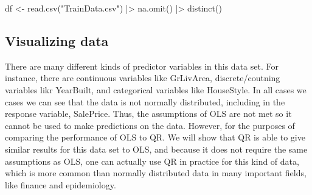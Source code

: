 \documentclass[
  letterpaper,
  DIV=11,
  numbers=noendperiod]{scrreprt}
\newenvironment{Shaded}{\begin{snugshade}}{\end{snugshade}}
\newcommand{\FunctionTok}[1]{\textcolor[rgb]{0.28,0.35,0.67}{#1}}
\newcommand{\NormalTok}[1]{\textcolor[rgb]{0.00,0.23,0.31}{#1}}
\newcommand{\OtherTok}[1]{\textcolor[rgb]{0.00,0.23,0.31}{#1}}
\newcommand{\SpecialCharTok}[1]{\textcolor[rgb]{0.37,0.37,0.37}{#1}}
\newcommand{\StringTok}[1]{\textcolor[rgb]{0.13,0.47,0.30}{#1}}
\begin{document}
\begin{Shaded}
\begin{Highlighting}[]
\NormalTok{df }\OtherTok{\textless{}{-}} \FunctionTok{read.csv}\NormalTok{(}\StringTok{"TrainData.csv"}\NormalTok{) }\SpecialCharTok{|\textgreater{}}
  \FunctionTok{na.omit}\NormalTok{() }\SpecialCharTok{|\textgreater{}}
  \FunctionTok{distinct}\NormalTok{()}
\end{Highlighting}
\end{Shaded}

\hypertarget{visualizing-data}{%
\subsection{Visualizing data}\label{visualizing-data}}

There are many different kinds of predictor variables in this data set.
For instance, there are continuous variables like GrLivArea,
discrete/coutning variables likr YearBuilt, and categorical variables
like HouseStyle. In all cases we cases we can see that the data is not
normally distributed, including in the response variable, SalePrice.
Thus, the assumptions of OLS are not met so it cannot be used to make
predictions on the data. However, for the purposes of comparing the
performance of OLS to QR. We will show that QR is able to give similar
results for this data set to OLS, and because it does not require the
same assumptions as OLS, one can actually use QR in practice for this
kind of data, which is more common than normally distributed data in
many important fields, like finance and epidemiology.
\end{document}
